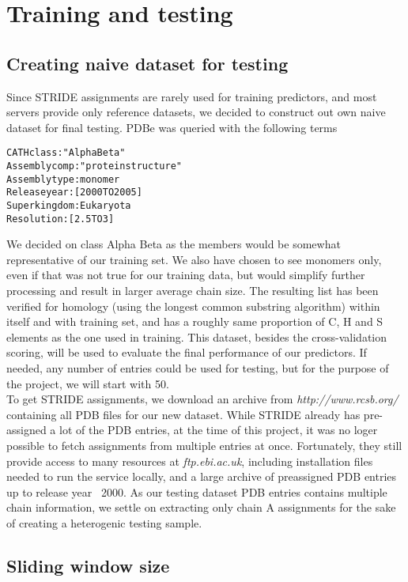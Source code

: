 \documentclass[12pt]{article}
\begin{document}
\section{Training and testing}

\subsection{Creating naive dataset for testing}

Since STRIDE assignments are rarely used for training predictors,  and most servers provide only reference datasets, we decided to construct out own naive dataset for final testing. 
PDBe was queried with the following terms 
\begin{alltt} 
   CATH class    : "Alpha Beta"
   Assembly comp : "protein structure"
   Assembly type : monomer
   Release year  : [2000 TO 2005]
   Superkingdom  : Eukaryota
   Resolution    : [2.5 TO 3]
\end{alltt} 
We decided on class Alpha Beta as the members would be somewhat representative of our training set. We also have chosen to see monomers only, even if that was not true for our training data, but would simplify further processing and result in larger average chain size. The resulting list has been verified for homology (using the longest common substring algorithm) within itself and with training set, and has a roughly same proportion of C, H and S elements as the one used in training. This dataset, besides the cross-validation scoring, will be used to evaluate the final performance of our predictors. If needed, any number of entries could be used for testing, but for the purpose of the project, we will start with 50.\\
To get STRIDE assignments, we download an archive from \emph{http://www.rcsb.org/} containing all PDB files for our new dataset. While STRIDE already has pre-assigned a lot of the PDB entries, at the time of this project, it was no loger possible to fetch assignments from multiple entries at once. Fortunately, they still provide access to many resources at \emph{ftp.ebi.ac.uk}, including installation files needed to run the service locally, and a large archive of preassigned PDB entries up to release year ~2000.
As our testing dataset PDB entries contains multiple chain information, we settle on extracting only chain A assignments for the sake of creating a heterogenic testing sample.



\subsection{Sliding window size}
\end{document}
